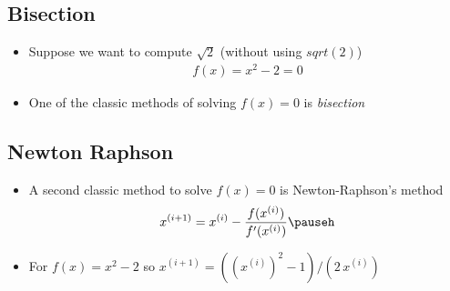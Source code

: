 
\begin{slide}
\section[-2]{Bisection}
\pb
\begin{itemize}
\item Suppose we want to compute $\sqrt{2}$ (without using
  \jl$sqrt(2)$)\pauseh
  \begin{align*}
    f(x) = x^2 - 2 = 0
  \end{align*}
\item One of the classic methods of solving $f(x)=0$ is
  \emph{bisection}\pauseh{}
  \begin{center}
    \pause
  \end{center}
\end{itemize}

\end{slide}


\begin{slide}
\section[-2]{Newton Raphson}

\pb
\begin{itemize}
\item A second classic method to solve $f(x)=0$ is Newton-Raphson's
  method
  \begin{align*}
    x^{(i+1)} = x^{(i)} - \frac{f(x^{(i)})}{f'(x^{(i)})}\pauseh 
  \end{align*}
\item For $f(x)=x^2-2$ so $x^{(i+1)} = ((x^{(i)})^2-1)/(2\,x^{(i)})$ 
  \pauseh{}
  \begin{center}
    \pause
  \end{center}
\end{itemize}

\end{slide}



